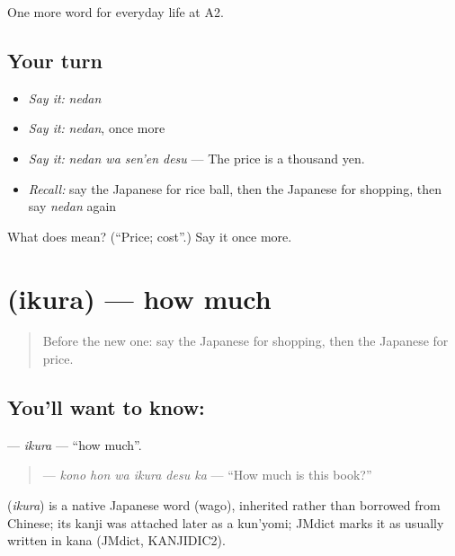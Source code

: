 \begin{grammarlens}[title={What you've built}]
One more word for everyday life at A2.
\end{grammarlens}

\subsection*{Your turn}
\begin{itemize}
\raggedright
  \item \emph{Say it:} \emph{nedan}
  \item \emph{Say it:} \emph{nedan}, once more
  \item \emph{Say it:} \emph{nedan wa sen'en desu} — The price is a thousand yen.
  \item \emph{Recall:} say the Japanese for rice ball, then the Japanese for shopping, then say \emph{nedan} again
\end{itemize}

\begin{tcolorbox}[breakable,colback=teal!4,colframe=teal!35!black,title={Before you move on}]
What does  mean? (\textquotedblleft{}Price; cost\textquotedblright{}.) Say it once more.
\end{tcolorbox}
\section[\texorpdfstring{\ja{いくら} (ikura)}{いくら (ikura)}]{ (ikura) — how much}

\label{lesson:JA-C181-ikura}



\begin{quote}
Before the new one: say the Japanese for shopping, then the Japanese for price.
\end{quote}

\subsection*{You'll want to know: }
\textbf{} — \emph{ikura} — \textquotedblleft{}how much\textquotedblright{}.

\begin{quote}
\textbf{  } — \emph{kono hon wa ikura desu ka} — \textquotedblleft{}How much is this book?\textquotedblright{}
\end{quote}

\begin{cousinweb}
\textbf{} (\emph{ikura}) is a native Japanese word (wago), inherited rather than borrowed from Chinese; its kanji was attached later as a kun'yomi; JMdict marks it as usually written in kana (JMdict, KANJIDIC2).
\end{cousinweb}

